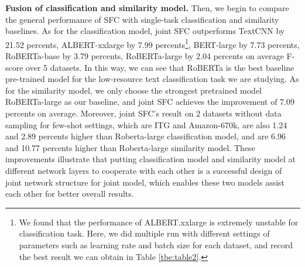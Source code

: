 \documentclass[letterpaper]{article} %
\begin{document}
  \textbf{Fusion  of  classification  and  similarity  model.} Then, we begin to
  compare  the  general  performance  of SFC with single-task classification and
  similarity  baselines.  As  for  the  classification  model,  joint SFC
  outperforms    TextCNN    by   21.52   percents,   ALBERT-xxlarge   by   7.99
  percents\footnote{We found that the performance of ALBERT.xxlarge is extremely
  unstable  for  classification  task.  Here, we did multiple run with different
  settings  of parameters such as learning rate and batch size for each dataset,
  and  record  the  best  result  we  can  obtain  in  Table \ref{tbe:table2}.},
  BERT-large  by  7.73 percents, RoBERTa-base by 3.79 percents, RoBERTa-large by
  2.04 percents on average F-score over 5 datasets. In this way, we can see that
  RoBERTa  is  the  best  baseline  pre-trained  model for the low-resource text
  classification  task  we  are  studying.  As for the similarity model, we only
  choose  the  strongest  pretrained  model  RoBERTa-large  as our baseline, and
  joint  SFC  achieves  the  improvement  of  7.09  percents  on average.
  Moreover,  joint  SFC's  result on 2 datasets without data sampling for
  few-shot  settings,  which  are  ITG  and  Amazon-670k, are also 1.24 and 2.89
  percents  higher  than  Roberta-large  classification  model, and are 6.96 and
  10.77  percents higher than Roberta-large similarity model. These improvements
  illustrate that putting classification model and similarity model at different
  network  layers  to  cooperate  with  each  other  is  a  successful design of
  joint network structure for joint model, which enables these two models
  assist each other for better overall results.
\end{document}
